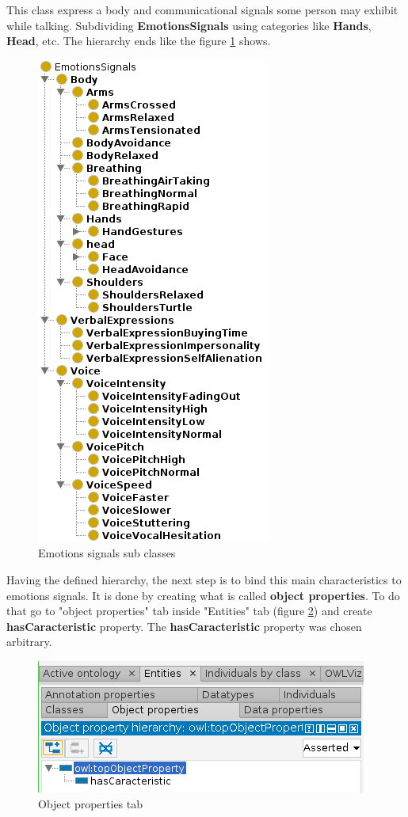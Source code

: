 \documentclass[conference]{IEEEtran}
\begin{document}
This class express a body and communicational signals some person may exhibit while talking. Subdividing \textbf{EmotionsSignals} using categories like \textbf{Hands}, \textbf{Head}, etc. The hierarchy ends like the figure \ref{fig:allEmotinalSinals} shows.
\begin{figure}[bpht]
	\centering
	\includegraphics[width=0.5\linewidth]{allEmotinalSinals}
	\caption{Emotions signals sub classes}
	\label{fig:allEmotinalSinals}
\end{figure}
Having the defined hierarchy, the next step is to bind this main characteristics to emotions signals. It is done by creating what is called \textbf{object properties}. To do that go to "object properties" tab  inside "Entities" tab (figure \ref{fig:objectproperties}) and create \textbf{hasCaracteristic} property. The \textbf{hasCaracteristic} property was chosen arbitrary.
\begin{figure}[bpht]
	\centering
	\includegraphics[width=0.7\linewidth]{objectProperties}
	\caption{Object properties tab}
	\label{fig:objectproperties}
\end{figure}
\end{document}
